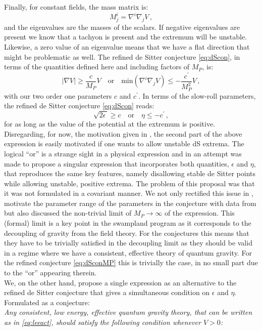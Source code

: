 \documentclass[a4paper,12pt]{report}
\newcommand{\be}{\begin{equation}}
\newcommand{\ee}{\end{equation}}
\begin{document}
Finally, for constant fields, the mass matrix is:
\be
M^i_j= \nabla^i \nabla_j V\,,
\ee
and the eigenvalues are the masses of the scalars. If negative eigenvalues are present we know that a tachyon is present and the extremum will be unstable. Likewise, a zero value of an eigenvalue means that we have a flat direction that might be problematic as well. The refined de Sitter conjecture \eqref{eq:dScon}, in terms of the quantities defined here and including factors of $M_P$, is:
\be 
|\nabla V| \geq \frac{c}{M_P} V \quad \text{or} \quad \text{min}(\nabla^i \nabla_j V) \leq - \frac{c^ \prime}{M_P^ 2} V\,,
\label{eq:dSconMP}
\ee
with our two order one parameters $c$ and $c^ \prime$. In terms of the slow-roll parameters, the refined de Sitter conjecture \eqref{eq:dScon} reads:
\be 
\sqrt{2 \epsilon \,} \geq c \quad \text{or} \quad \eta \leq - c^\prime\,,
\ee
for as long as the value of the potential at the extremum is positive. Disregarding, for now, the motivation given in \cite{Ooguri:2018wrx}, the second part of the above expression is easily motivated if one wants to allow unstable dS extrema. The logical ``or'' is a strange sight in a physical expression and in \cite{Andriot:2018wzk} an attempt was made to propose a singular expression that incorporates both quantities, $\epsilon$ and $\eta$, that reproduces the same key features, namely disallowing stable de Sitter points while allowing unstable, positive extrema. The problem of this proposal was that it was not formulated in a covariant manner. We not only rectified this issue in \cite{Andriot:2018mav}, motivate the parameter range of the parameters in the conjecture with data from \cite{Roupec:2018mbn} but also discussed the non-trivial limit of $M_P \to \infty$ of the expression. This (formal) limit is a key point in the swampland program as it corresponds to the decoupling of gravity from the field theory. For the conjectures this means that they have to be trivially satisfied in the decoupling limit as they should be valid in a regime where we have a consistent, effective theory of quantum gravity. For the refined conjecture \eqref{eq:dSconMP} this is trivially the case, in no small part due to the ``or'' appearing therein.\\
We, on the other hand, propose a single expression as an alternative to the refined de Sitter conjecture that gives a simultaneous condition on $\epsilon$ and $\eta$. Formulated as a conjecture:\\
\emph{Any consistent, low energy, effective quantum gravity theory, that can be written as in \eqref{eq:leeact}, should satisfy the following condition whenever $V>0$:}
\end{document}
